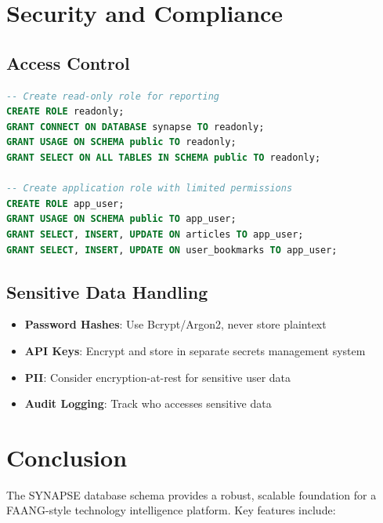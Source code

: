 \documentclass[12pt,a4paper]{report}
\begin{document}
\newpage

\chapter{Security and Compliance}

\section{Access Control}

\begin{lstlisting}[language=SQL,basicstyle=\ttfamily\small]
-- Create read-only role for reporting
CREATE ROLE readonly;
GRANT CONNECT ON DATABASE synapse TO readonly;
GRANT USAGE ON SCHEMA public TO readonly;
GRANT SELECT ON ALL TABLES IN SCHEMA public TO readonly;

-- Create application role with limited permissions
CREATE ROLE app_user;
GRANT USAGE ON SCHEMA public TO app_user;
GRANT SELECT, INSERT, UPDATE ON articles TO app_user;
GRANT SELECT, INSERT, UPDATE ON user_bookmarks TO app_user;
\end{lstlisting}

\section{Sensitive Data Handling}

\begin{itemize}
    \item \textbf{Password Hashes}: Use Bcrypt/Argon2, never store plaintext
    \item \textbf{API Keys}: Encrypt and store in separate secrets management system
    \item \textbf{PII}: Consider encryption-at-rest for sensitive user data
    \item \textbf{Audit Logging}: Track who accesses sensitive data
\end{itemize}

\newpage

\chapter{Conclusion}

The SYNAPSE database schema provides a robust, scalable foundation for a FAANG-style technology intelligence platform. Key features include:
\end{document}
